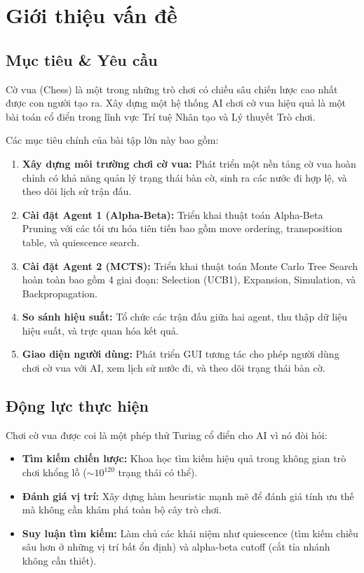 \section{Giới thiệu vấn đề}

\subsection{Mục tiêu \& Yêu cầu}
Cờ vua (Chess) là một trong những trò chơi có chiều sâu chiến lược cao nhất được con người tạo ra. Xây dựng một hệ thống AI chơi cờ vua hiệu quả là một bài toán cổ điển trong lĩnh vực Trí tuệ Nhân tạo và Lý thuyết Trò chơi.

Các mục tiêu chính của bài tập lớn này bao gồm:
\begin{enumerate}
    \item \textbf{Xây dựng môi trường chơi cờ vua:} Phát triển một nền tảng cờ vua hoàn chỉnh có khả năng quản lý trạng thái bàn cờ, sinh ra các nước đi hợp lệ, và theo dõi lịch sử trận đấu.
    \item \textbf{Cài đặt Agent 1 (Alpha-Beta):} Triển khai thuật toán Alpha-Beta Pruning với các tối ưu hóa tiên tiến bao gồm move ordering, transposition table, và quiescence search.
    \item \textbf{Cài đặt Agent 2 (MCTS):} Triển khai thuật toán Monte Carlo Tree Search hoàn toàn bao gồm 4 giai đoạn: Selection (UCB1), Expansion, Simulation, và Backpropagation.
    \item \textbf{So sánh hiệu suất:} Tổ chức các trận đấu giữa hai agent, thu thập dữ liệu hiệu suất, và trực quan hóa kết quả.
    \item \textbf{Giao diện người dùng:} Phát triển GUI tương tác cho phép người dùng chơi cờ vua với AI, xem lịch sử nước đi, và theo dõi trạng thái bàn cờ.
\end{enumerate}

\subsection{Động lực thực hiện}
Chơi cờ vua được coi là một phép thử Turing cổ điển cho AI vì nó đòi hỏi:
\begin{itemize}
    \item \textbf{Tìm kiếm chiến lược:} Khoa học tìm kiếm hiệu quả trong không gian trò chơi khổng lồ ($\sim 10^{120}$ trạng thái có thể).
    \item \textbf{Đánh giá vị trí:} Xây dựng hàm heuristic mạnh mẽ để đánh giá tính ưu thế mà không cần khám phá toàn bộ cây trò chơi.
    \item \textbf{Suy luận tìm kiếm:} Làm chủ các khái niệm như quiescence (tìm kiếm chiều sâu hơn ở những vị trí bất ổn định) và alpha-beta cutoff (cắt tỉa nhánh không cần thiết).
\end{itemize}

